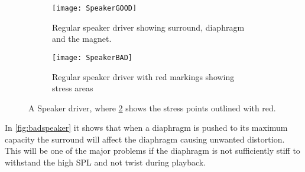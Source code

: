 \begin{figure}[H]
\centering
\begin{subfigure}[t]{0.47\textwidth}
\texttt{[image: SpeakerGOOD]}
	\caption{Regular speaker driver showing surround, diaphragm and the magnet.}
	\label{fig:regularspeaker}
\end{subfigure}
\hspace{6mm} 
\begin{subfigure}[t]{0.47\textwidth}
\texttt{[image: SpeakerBAD]}
	\caption{Regular speaker driver with red markings showing stress areas}
	\label{fig:badspeaker}
\end{subfigure}
\caption{A Speaker driver, where \ref{fig:badspeaker} shows the stress points outlined with red.}
\label{fig:SpeakerModelStress}
\end{figure}
In \autoref{fig:badspeaker} it shows that when a diaphragm is pushed to its maximum capacity the surround will affect the diaphragm causing unwanted distortion. This will be one of the major problems if the diaphragm is not sufficiently stiff to withstand the high \gls{SPL} and not twist during playback. 








